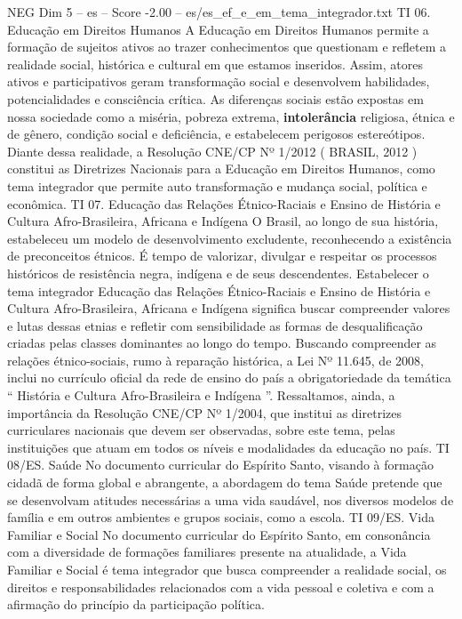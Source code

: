 \begin{textsample}{NEG Dim 5 – es – Score -2.00 – es/es\_ef\_e\_em\_tema\_integrador.txt}
TI 06.
Educação em Direitos Humanos A Educação em Direitos Humanos permite a formação de sujeitos ativos ao trazer conhecimentos que questionam e refletem a realidade social, histórica e cultural em que estamos inseridos.
Assim, atores ativos e participativos geram transformação social e desenvolvem habilidades, potencialidades e consciência crítica.
As diferenças sociais estão expostas em nossa sociedade como a miséria, pobreza extrema, \textbf{intolerância} religiosa, étnica e de gênero, condição social e deficiência, e estabelecem perigosos estereótipos.
Diante dessa realidade, a Resolução CNE/CP Nº 1/2012 ( BRASIL, 2012 ) constitui as Diretrizes Nacionais para a Educação em Direitos Humanos, como tema integrador que permite auto transformação e mudança social, política e econômica.
TI 07.
Educação das Relações Étnico-Raciais e Ensino de História e Cultura Afro-Brasileira, Africana e Indígena O Brasil, ao longo de sua história, estabeleceu um modelo de desenvolvimento excludente, reconhecendo a existência de preconceitos étnicos.
É tempo de valorizar, divulgar e respeitar os processos históricos de resistência negra, indígena e de seus descendentes.
Estabelecer o tema integrador Educação das Relações Étnico-Raciais e Ensino de História e Cultura Afro-Brasileira, Africana e Indígena significa buscar compreender valores e lutas dessas etnias e refletir com sensibilidade as formas de desqualificação criadas pelas classes dominantes ao longo do tempo.
Buscando compreender as relações étnico-sociais, rumo à reparação histórica, a Lei Nº 11.645, de 2008, inclui no currículo oficial da rede de ensino do país a obrigatoriedade da temática “ História e Cultura Afro-Brasileira e Indígena ”.
Ressaltamos, ainda, a importância da Resolução CNE/CP Nº 1/2004, que institui as diretrizes curriculares nacionais que devem ser observadas, sobre este tema, pelas instituições que atuam em todos os níveis e modalidades da educação no país.
TI 08/ES.
Saúde No documento curricular do Espírito Santo, visando à formação cidadã de forma global e abrangente, a abordagem do tema Saúde pretende que se desenvolvam atitudes necessárias a uma vida saudável, nos diversos modelos de família e em outros ambientes e grupos sociais, como a escola.
TI 09/ES.
Vida Familiar e Social No documento curricular do Espírito Santo, em consonância com a diversidade de formações familiares presente na atualidade, a Vida Familiar e Social é tema integrador que busca compreender a realidade social, os direitos e responsabilidades relacionados com a vida pessoal e coletiva e com a afirmação do princípio da participação política.

\end{textsample}
